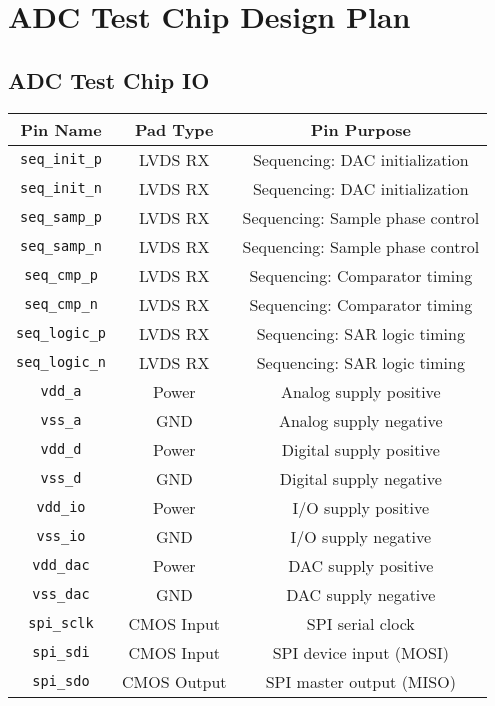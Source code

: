 \documentclass{article}
\begin{document}
\section{ADC Test Chip Design Plan}\label{adc-test-chip-design-plan}

\subsection{ADC Test Chip IO}\label{adc-test-chip-io}

\begin{table}[h!]
\centering
\begin{tabular}{ccc}
\toprule
Pin Name & Pad Type & Pin Purpose \\
\midrule
\texttt{seq\_init\_p} & LVDS RX & Sequencing: DAC initialization \\
\texttt{seq\_init\_n} & LVDS RX & Sequencing: DAC initialization \\
\texttt{seq\_samp\_p} & LVDS RX & Sequencing: Sample phase control \\
\texttt{seq\_samp\_n} & LVDS RX & Sequencing: Sample phase control \\
\texttt{seq\_cmp\_p} & LVDS RX & Sequencing: Comparator timing \\
\texttt{seq\_cmp\_n} & LVDS RX & Sequencing: Comparator timing \\
\texttt{seq\_logic\_p} & LVDS RX & Sequencing: SAR logic timing \\
\texttt{seq\_logic\_n} & LVDS RX & Sequencing: SAR logic timing \\
\texttt{vdd\_a} & Power & Analog supply positive \\
\texttt{vss\_a} & GND & Analog supply negative \\
\texttt{vdd\_d} & Power & Digital supply positive \\
\texttt{vss\_d} & GND & Digital supply negative \\
\texttt{vdd\_io} & Power & I/O supply positive \\
\texttt{vss\_io} & GND & I/O supply negative \\
\texttt{vdd\_dac} & Power & DAC supply positive \\
\texttt{vss\_dac} & GND & DAC supply negative \\
\texttt{spi\_sclk} & CMOS Input & SPI serial clock \\
\texttt{spi\_sdi} & CMOS Input & SPI device input (MOSI) \\
\texttt{spi\_sdo} & CMOS Output & SPI master output (MISO) \\

\end{tabular}
\end{table}
\end{document}
